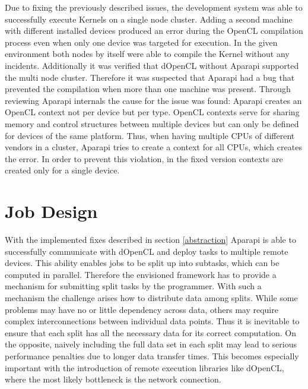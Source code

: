 \begin{description}[style=nextline]
	\item [Failed compilations when using multiple devices]
	Due to fixing the previously described issues, the development system was able to successfully execute Kernels on a single node cluster. Adding a second machine with different installed devices produced an error during the OpenCL compilation process even when only one device was targeted for execution. In the given environment both nodes by itself were able to compile the Kernel without any incidents. Additionally it was verified that dOpenCL without Aparapi supported the multi node cluster. Therefore it was suspected that Aparapi had a bug that prevented the compilation when more than one machine was present. Through reviewing Aparapi internals the cause for the issue was found: Aparapi creates an OpenCL context not per device but per type. OpenCL contexts serve for sharing memory and control structures between multiple devices but can only be defined for devices of the same platform. Thus, when having multiple CPUs of different vendors in a cluster, Aparapi tries to create a context for all CPUs, which creates the error. In order to prevent this violation, in the fixed version contexts are created only for a single device.
	
\end{description} 
 

\section{Job Design}
\label{job_design}
With the implemented fixes described in section \ref{abstraction} Aparapi is able to successfully communicate with dOpenCL and deploy tasks to multiple remote devices. This ability enables jobs to be split up into subtasks, which can be computed in parallel. Therefore the envisioned framework has to provide a mechanism for submitting split tasks by the programmer. With such a mechanism the challenge arises how to distribute data among splits. While some problems may have no or little dependency across data, others may require complex interconnections between individual data points. Thus it is inevitable to ensure that each split has all the necessary data for its correct computation. On the opposite, naively including the full data set in each split may lead to serious performance penalties due to longer data transfer times. This becomes especially important with the introduction of remote execution libraries like dOpenCL, where the most likely bottleneck is the network connection.

